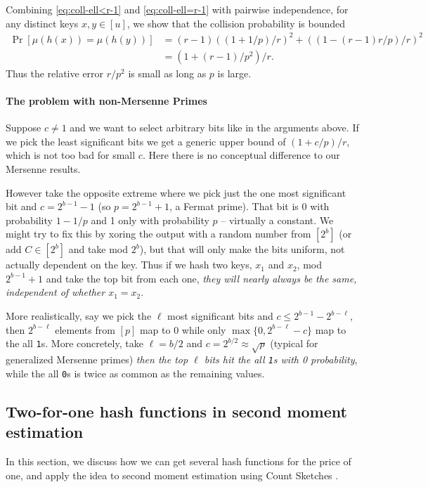 Combining \eqref{eq:coll-ell<r-1} and \eqref{eq:coll-ell=r-1} with
pairwise independence, for any distinct keys $x,y\in [u]$, we show that the
collision probability is bounded
\begin{align}
	\Pr[\mu(h(x))=\mu(h(y))]
	 & =(r-1)((1+1/p)/r)^2+((1-(r-1)r/p)/r)^2 \nonumber
	\\&=(1+(r-1)/p^2)/r
	.\label{eq:coll}
\end{align}
Thus the relative error $r/p^2$ is small as long as $p$ is large.

\paragraph{The problem with non-Mersenne Primes}

Suppose $c\neq 1$ and we want to select arbitrary bits like in the arguments above.
If we pick the least significant bits we get a generic upper bound of $(1+c/p)/r$, which is not too bad for small $c$.
Here there is no conceptual difference to our Mersenne results.

However take the opposite extreme where
we pick just the one most significant bit
and $c=2^{b-1}-1$ (so $p=2^{b-1}+1$, a Fermat prime).
That bit is $0$ with probability $1-1/p$ and 1 only with probability $p$ -- virtually a constant.
We might try to fix this by xoring the output with a random number from $[2^b]$ (or add $C\in[2^b]$ and take mod $2^b$), but that will only make the bits uniform, not actually dependent on the key.
Thus if we hash two keys, $x_1$ and $x_2$, mod $2^{b-1}+1$ and take the top bit from each one, \emph{they will nearly always be the same, independent of whether $x_1=x_2$}.

More realistically,
say we pick the $\ell$ most significant bits
and $c\leq 2^{b-1}-2^{b-\ell}$, then $2^{b-\ell}$ elements from
$[p]$ map to $0$ while only $\max\{0,2^{b-\ell}-c\}$
map to the all \texttt{1}s.
More concretely, take $\ell=b/2$ and $c=2^{b/2}\approx\sqrt{p}$ (typical for generalized Mersenne primes) \emph{then the top $\ell$ bits hit the all \texttt{1}s with 0 probability}, while the all \texttt{0}s is twice as common as the remaining values.


\subsection{Two-for-one hash functions in second moment estimation}
In this section, we discuss how we can get several hash functions for
the price of one, and apply the idea to second moment estimation using
Count Sketches \cite{charikar04count-sketch}.

